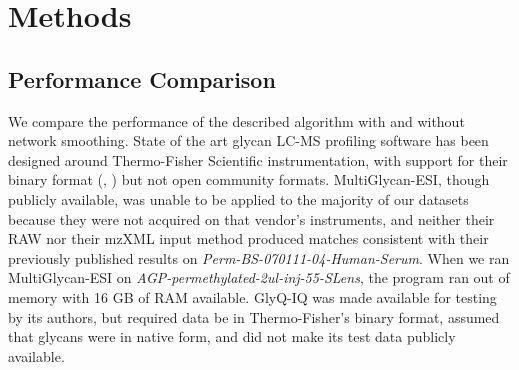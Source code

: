\section{Methods}











\subsection{Performance Comparison}
    We compare the performance of the described algorithm with and without
    network smoothing. State of the art glycan LC-MS profiling software
    has been designed around Thermo-Fisher Scientific instrumentation, with
    support for their binary format (\cite{Kronewitter2014}, \cite{Yu2013})
    but not open community formats. MultiGlycan-ESI, though publicly available,
    was unable to be applied to the majority of our datasets because they were
    not acquired on that vendor's instruments, and neither their RAW nor their mzXML
    input method produced matches consistent with their previously published results
    on \textit{Perm-BS-070111-04-Human-Serum}. When we ran MultiGlycan-ESI on
    \textit{AGP-permethylated-2ul-inj-55-SLens}, the program ran out of memory with 16 GB
    of RAM available. GlyQ-IQ was made available for testing by its authors, but required
    data be in Thermo-Fisher's binary format, assumed that glycans were in native form, and
    did not make its test data publicly available.
